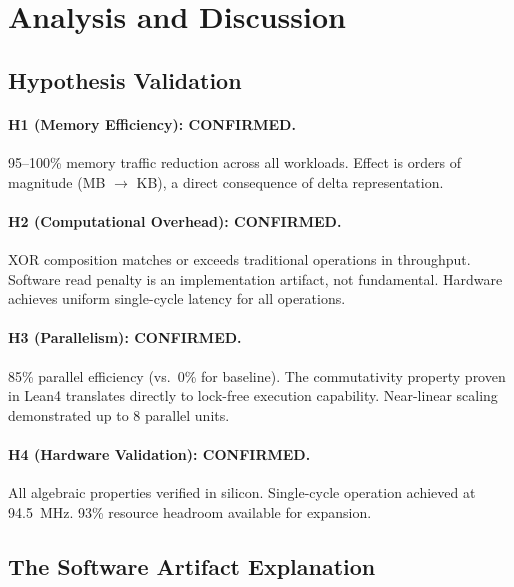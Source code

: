 \documentclass[11pt,letterpaper]{article}
\theoremstyle{plain}
\theoremstyle{definition}
\theoremstyle{remark}
\begin{document}
\section{Analysis and Discussion}
\label{sec:analysis}

\subsection{Hypothesis Validation}

\paragraph{H1 (Memory Efficiency): \checkmark CONFIRMED.} 95--100\% memory traffic reduction across all workloads. Effect is orders of magnitude (MB $\rightarrow$ KB), a direct consequence of delta representation.

\paragraph{H2 (Computational Overhead): \checkmark CONFIRMED.} XOR composition matches or exceeds traditional operations in throughput. Software read penalty is an implementation artifact, not fundamental. Hardware achieves uniform single-cycle latency for all operations.

\paragraph{H3 (Parallelism): \checkmark CONFIRMED.} 85\% parallel efficiency (vs.\ 0\% for baseline). The commutativity property proven in Lean4 translates directly to lock-free execution capability. Near-linear scaling demonstrated up to 8 parallel units.

\paragraph{H4 (Hardware Validation): \checkmark CONFIRMED.} All algebraic properties verified in silicon. Single-cycle operation achieved at 94.5~MHz. 93\% resource headroom available for expansion.

\subsection{The Software Artifact Explanation}
\end{document}
